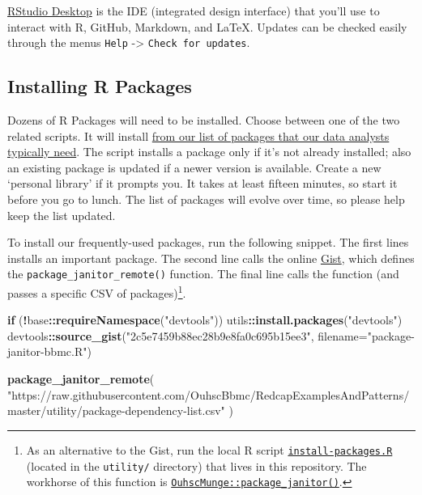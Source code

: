 \documentclass[
]{book}
\newenvironment{Shaded}{\begin{snugshade}}{\end{snugshade}}
\newcommand{\ControlFlowTok}[1]{\textcolor[rgb]{0.13,0.29,0.53}{\textbf{#1}}}
\newcommand{\DataTypeTok}[1]{\textcolor[rgb]{0.13,0.29,0.53}{#1}}
\newcommand{\KeywordTok}[1]{\textcolor[rgb]{0.13,0.29,0.53}{\textbf{#1}}}
\newcommand{\NormalTok}[1]{#1}
\newcommand{\OperatorTok}[1]{\textcolor[rgb]{0.81,0.36,0.00}{\textbf{#1}}}
\newcommand{\StringTok}[1]{\textcolor[rgb]{0.31,0.60,0.02}{#1}}
\begin{document}
\href{http://www.rstudio.com/ide/download/desktop}{RStudio Desktop} is the IDE (integrated design interface) that you'll use to interact with R, GitHub, Markdown, and LaTeX. Updates can be checked easily through the menus \texttt{Help} -\textgreater{} \texttt{Check\ for\ updates}.

\hypertarget{workstation-r-package-installation}{%
\subsection{Installing R Packages}\label{workstation-r-package-installation}}

Dozens of R Packages will need to be installed. Choose between one of the two related scripts. It will install \href{https://github.com/OuhscBbmc/RedcapExamplesAndPatterns/blob/master/utility/package-dependency-list.csv}{from our list of packages that our data analysts typically need}. The script installs a package only if it's not already installed; also an existing package is updated if a newer version is available. Create a new `personal library' if it prompts you. It takes at least fifteen minutes, so start it before you go to lunch. The list of packages will evolve over time, so please help keep the list updated.

To install our frequently-used packages, run the following snippet. The first lines installs an important package. The second line calls the online \href{https://gist.github.com/wibeasley/2c5e7459b88ec28b9e8fa0c695b15ee3}{Gist}, which defines the \texttt{package\_janitor\_remote()} function. The final line calls the function (and passes a specific CSV of packages)\footnote{As an alternative to the Gist, run the local R script \href{https://github.com/OuhscBbmc/RedcapExamplesAndPatterns/blob/master/utility/install-packages.R}{\texttt{install-packages.R}} (located in the \texttt{utility/} directory) that lives in this repository. The workhorse of this function is \href{https://github.com/OuhscBbmc/OuhscMunge/blob/master/R/package-janitor.R}{\texttt{OuhscMunge::package\_janitor()}}.}.

\begin{Shaded}
\begin{Highlighting}[]
\ControlFlowTok{if}\NormalTok{ (}\OperatorTok{!}\NormalTok{base}\OperatorTok{::}\KeywordTok{requireNamespace}\NormalTok{(}\StringTok{"devtools"}\NormalTok{)) utils}\OperatorTok{::}\KeywordTok{install.packages}\NormalTok{(}\StringTok{"devtools"}\NormalTok{)}
\NormalTok{devtools}\OperatorTok{::}\KeywordTok{source\_gist}\NormalTok{(}\StringTok{"2c5e7459b88ec28b9e8fa0c695b15ee3"}\NormalTok{, }\DataTypeTok{filename=}\StringTok{"package{-}janitor{-}bbmc.R"}\NormalTok{)}

\KeywordTok{package\_janitor\_remote}\NormalTok{(}
  \StringTok{"https://raw.githubusercontent.com/OuhscBbmc/RedcapExamplesAndPatterns/master/utility/package{-}dependency{-}list.csv"}
\NormalTok{)}
\end{Highlighting}
\end{Shaded}
\end{document}
